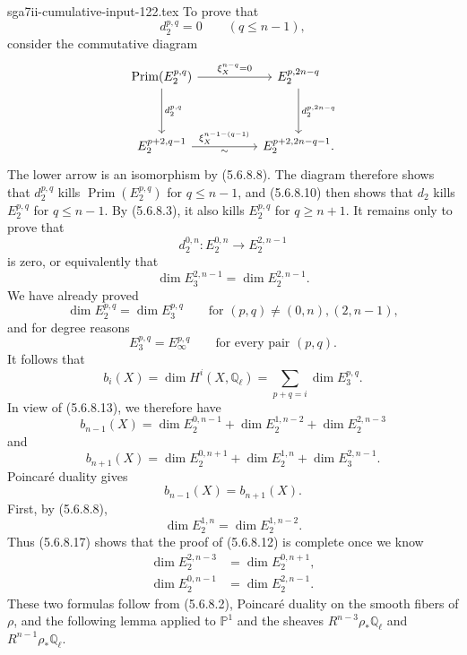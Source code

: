 \begin{filecontents*}{sga7ii-cumulative-input-122.tex}
To prove that
\[
d_2^{p,q}=0\qquad(q\leq n-1),
\]
consider the commutative diagram
\[
\begin{tikzcd}[column sep=huge,row sep=huge]
\operatorname{Prim}(E_2^{p,q})
  \arrow[r,"\xi_X^{n-q}=0"]
  \arrow[d,"d_2^{p,q}"]
&
E_2^{p,2n-q}
  \arrow[d,"d_2^{p,2n-q}"]
\\
E_2^{p+2,q-1}
  \arrow[r,"\xi_X^{n-1-(q-1)}","\sim"']
&
E_2^{p+2,2n-q-1}.
\end{tikzcd}
\]
The lower arrow is an isomorphism by (5.6.8.8).  The diagram therefore shows
that $d_2^{p,q}$ kills $\operatorname{Prim}(E_2^{p,q})$ for $q\leq n-1$,
and (5.6.8.10) then shows that $d_2$ kills $E_2^{p,q}$ for $q\leq n-1$.
By (5.6.8.3), it also kills $E_2^{p,q}$ for $q\geq n+1$.  It remains only
to prove that
\[
d_2^{0,n}:E_2^{0,n}\longrightarrow E_2^{2,n-1}
\]
is zero, or equivalently that
\begin{equation}\tag{5.6.8.12}
\dim E_3^{2,n-1}=\dim E_2^{2,n-1}.
\end{equation}
We have already proved
\begin{equation}\tag{5.6.8.13}
\dim E_2^{p,q}=\dim E_3^{p,q}
\qquad\text{for }(p,q)\neq(0,n),(2,n-1),
\end{equation}
and for degree reasons
\begin{equation}\tag{5.6.8.14}
E_3^{p,q}=E_\infty^{p,q}
\qquad\text{for every pair }(p,q).
\end{equation}
It follows that
\[
b_i(X)=\dim H^i(X,\mathbb Q_\ell)
=\sum_{p+q=i}\dim E_3^{p,q}.
\]
In view of (5.6.8.13), we therefore have
\begin{equation}\tag{5.6.8.15}
b_{n-1}(X)
=\dim E_2^{0,n-1}
 +\dim E_2^{1,n-2}
 +\dim E_2^{2,n-3}
\end{equation}
and
\begin{equation}\tag{5.6.8.16}
b_{n+1}(X)
=\dim E_2^{0,n+1}
 +\dim E_2^{1,n}
 +\dim E_3^{2,n-1}.
\end{equation}
Poincaré duality gives
\begin{equation}\tag{5.6.8.17}
b_{n-1}(X)=b_{n+1}(X).
\end{equation}
First, by (5.6.8.8),
\[
\dim E_2^{1,n}=\dim E_2^{1,n-2}.
\]
Thus (5.6.8.17) shows that the proof of (5.6.8.12) is complete once we know
\begin{align}
\dim E_2^{2,n-3}&=\dim E_2^{0,n+1},
\tag{5.6.8.18}\\
\dim E_2^{0,n-1}&=\dim E_2^{2,n-1}.
\tag{5.6.8.19}
\end{align}
These two formulas follow from (5.6.8.2), Poincaré duality on the smooth
fibers of $\rho$, and the following lemma applied to $\mathbb P^1$ and the
sheaves $R^{n-3}\rho_*\mathbb Q_\ell$ and
$R^{n-1}\rho_*\mathbb Q_\ell$.


\end{filecontents*}
